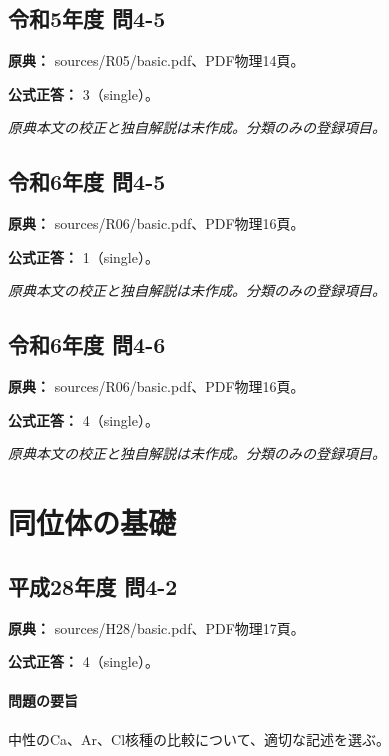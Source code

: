 \subsection{令和5年度 問4-5}
\label{q:r05-reg-basic-4-5}

\noindent\textbf{原典：} sources/R05/basic.pdf、PDF物理14頁。

\textbf{公式正答：} 3（single）。

\par\textit{原典本文の校正と独自解説は未作成。分類のみの登録項目。}

\subsection{令和6年度 問4-5}
\label{q:r06-reg-basic-4-5}

\noindent\textbf{原典：} sources/R06/basic.pdf、PDF物理16頁。

\textbf{公式正答：} 1（single）。

\par\textit{原典本文の校正と独自解説は未作成。分類のみの登録項目。}

\subsection{令和6年度 問4-6}
\label{q:r06-reg-basic-4-6}

\noindent\textbf{原典：} sources/R06/basic.pdf、PDF物理16頁。

\textbf{公式正答：} 4（single）。

\par\textit{原典本文の校正と独自解説は未作成。分類のみの登録項目。}

\section{同位体の基礎}

\subsection{平成28年度 問4-2}
\label{q:h28-reg-basic-4-2}

\noindent\textbf{原典：} sources/H28/basic.pdf、PDF物理17頁。

\textbf{公式正答：} 4（single）。

\paragraph{問題の要旨} 中性のCa、Ar、Cl核種の比較について、適切な記述を選ぶ。

